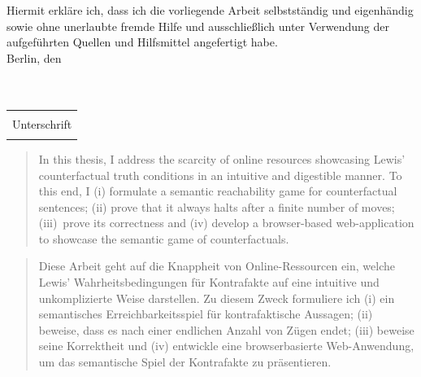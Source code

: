 \documentclass[a4paper,american,10pt]{paper}
\newcommand{\place}{Berlin}
\theoremstyle{definition}\newtheorem{lemma}[thm]{Lemma}
\theoremstyle{definition}\newtheorem{proposition}[thm]{Proposition}
\theoremstyle{definition}\newtheorem{corollary}[thm]{Corollary}
\theoremstyle{definition}\newtheorem{definition}{Definition}
\begin{document}
\newpage
\vspace*{\fill}
\large
\noindent Hiermit erkläre ich, dass ich die vorliegende Arbeit selbstständig und eigenhändig sowie ohne unerlaubte fremde Hilfe und ausschließlich unter Verwendung der aufgeführten Quellen und Hilfsmittel angefertigt habe.
\vspace{0.5cm}\\
\noindent \place, den\\\\
\normalsize
\vspace{0.25cm}\\
\begin{tabular}{c}
\dotfill\\
Unterschrift\\
\hphantom{\hspace{10cm}}
\end{tabular}
\newpage

\maketitle
\begin{abstract}
In this thesis, I address the scarcity of online resources showcasing Lewis' counterfactual truth conditions in an intuitive and digestible manner. To this end, I (i) formulate a semantic reachability game for counterfactual sentences; (ii) prove that it always halts after a finite number of moves; (iii)~prove its correctness and (iv) develop a browser-based web-application to showcase the semantic game of counterfactuals.
\end{abstract}
\begin{abstract}
Diese Arbeit geht auf die Knappheit von Online-Ressourcen ein, welche Lewis' Wahrheitsbedingungen für Kontrafakte auf eine intuitive und unkomplizierte Weise darstellen. Zu diesem Zweck formuliere ich (i) ein semantisches Erreichbarkeitsspiel für kontrafaktische Aussagen; (ii) beweise, dass es nach einer endlichen Anzahl von Zügen endet; (iii) beweise seine Korrektheit und (iv) entwickle eine browserbasierte Web-Anwendung, um das semantische Spiel der Kontrafakte zu präsentieren.
\end{abstract}
\newpage
\tableofcontents
\listoffigures
\newpage
\end{document}
